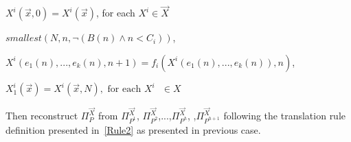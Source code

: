 \begin{itemize}
    \vspace{2mm}
$X^i(\vec{x},0) = X^i(\vec{x})$,  for each $X^i \in  \vec{X}$

\vspace{2mm}

$smallest(N, n, \neg (B(n) \land n<C_i))$, 

\vspace{2mm}
$X^i(e_1(n), ..., e_k(n),n+1) = f_i(X^i(e_1(n), ...,e_k(n)),n)$,

\vspace{2mm} 
$X^i_1(\vec{x}) = X^i(\vec{x}, N), \text{ for each $X^i$ $\in X$ }$

\vspace{2mm}

Then reconstruct $\Pi_P^{\vec{X}}$ from $\Pi_{P^{1}}^{\vec{X}}$, $\Pi_{P^{2}}^{\vec{X}}$,...,$\Pi_{P^{h}}^{\vec{X}}$, ,$\Pi_{P^{h+1}}^{\vec{X}}$ following the translation rule definition presented in~\ref{Rule2} as presented in previous case.


	
\end{itemize}




